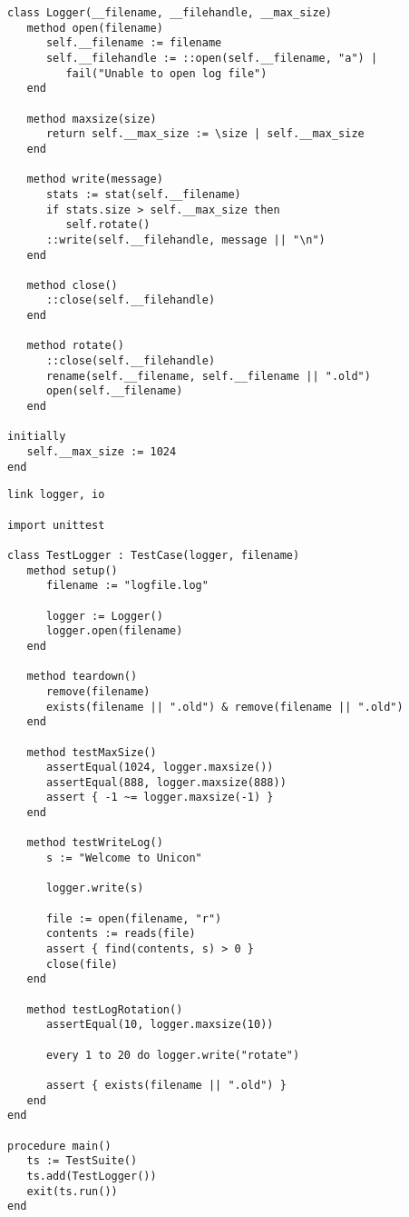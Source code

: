 \documentclass[letterpaper,12pt]{article}
\begin{document}
\bigskip{}
\begin{verbatim}
class Logger(__filename, __filehandle, __max_size)
   method open(filename)
      self.__filename := filename
      self.__filehandle := ::open(self.__filename, "a") | 
         fail("Unable to open log file")
   end

   method maxsize(size)
      return self.__max_size := \size | self.__max_size
   end

   method write(message)
      stats := stat(self.__filename)
      if stats.size > self.__max_size then
         self.rotate()
      ::write(self.__filehandle, message || "\n")
   end

   method close()
      ::close(self.__filehandle)
   end

   method rotate()
      ::close(self.__filehandle)
      rename(self.__filename, self.__filename || ".old")
      open(self.__filename)
   end

initially
   self.__max_size := 1024
end
\end{verbatim}

\bigskip{}
\begin{verbatim}
link logger, io

import unittest

class TestLogger : TestCase(logger, filename)
   method setup()
      filename := "logfile.log"
      
      logger := Logger()
      logger.open(filename)
   end

   method teardown()
      remove(filename)
      exists(filename || ".old") & remove(filename || ".old")
   end

   method testMaxSize()
      assertEqual(1024, logger.maxsize())
      assertEqual(888, logger.maxsize(888))
      assert { -1 ~= logger.maxsize(-1) }
   end

   method testWriteLog()
      s := "Welcome to Unicon"

      logger.write(s)

      file := open(filename, "r")
      contents := reads(file)
      assert { find(contents, s) > 0 }
      close(file)
   end

   method testLogRotation()
      assertEqual(10, logger.maxsize(10))

      every 1 to 20 do logger.write("rotate")

      assert { exists(filename || ".old") }
   end
end

procedure main()
   ts := TestSuite()
   ts.add(TestLogger())
   exit(ts.run())
end
\end{verbatim}
\end{document}
